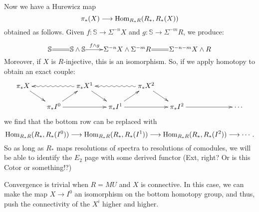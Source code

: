 \documentclass[11pt]{article}
\begin{document}
Now we have a Hurewicz map 
\[\pi_{*}(X)\longrightarrow\operatorname{Hom}_{R_*R}(R_*,R_*(X))\]
 obtained as follows. Given $f:\mathbb{S}\to \Sigma^{-n}X$ and $g:\mathbb{S}\to \Sigma^{-m}R$, we produce:
\[
\xymatrix@1{
\mathbb{S}\ar@{=}[r]&%
\mathbb{S}\sprod\mathbb{S}\ar[r]^-{f\sprod g}&%
\Sigma^{-n}X\sprod \Sigma^{-m}R\ar@{=}[r]&%
\Sigma^{-n-m}X\sprod R
}\]
Moreover, if $X$ is $R$-injective, this is an isomorphism. So, if we apply homotopy to obtain an exact couple:
\[\xymatrix@R=.5cm@C=.5cm@!C{
\pi_*X\ar[dr]&%
&%
\pi_*X^1\ar@{~>}[ll]\ar[dr]&%
&%
\pi_*X^2\ar@{~>}[ll]\ar[dr]&%
&%
&%
\\%
&%
\ar[ur]\pi_*I^0\ar[rr]&%
&%
\ar[ur]\pi_*I^1\ar[rr]&%
&%
\pi_*I^2\ar[rr]&%
&%
\cdots%
}\]
we find that the bottom row can be replaced with
\[\operatorname{Hom}_{R_*R}(R_*,R_*(I^0))\longrightarrow\operatorname{Hom}_{R_*R}(R_*,R_*(I^1))\longrightarrow\operatorname{Hom}_{R_*R}(R_*,R_*(I^2))\longrightarrow\cdots.\]
So as long as $R_*$ maps resolutions of spectra to resolutions of comodules, we will be able to identify the  $E_2$ page with some derived functor (Ext, right? Or is this Cotor or something!?)

\begin{rmk*}
Convergence is trivial when $R=MU$ and $X$ is connective. In this case, we can make the map $X\to I^0$ an isomorphism on the bottom homotopy group, and thus, push the connectivity of the $X^i$ higher and higher.
\end{rmk*}
\end{document}
